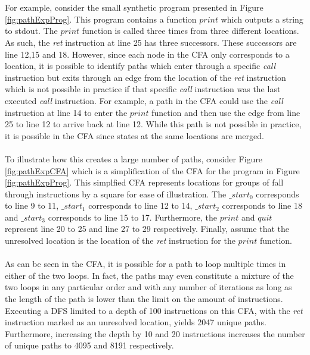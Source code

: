 \documentclass{kththesis}
\renewcommand{\it}[1]{\textit{#1}}
\begin{document}
\\ \\
For example, consider the small synthetic program presented in Figure \ref{fig:pathExpProg}. This program contains a function $print$ which outputs a string to stdout. The $print$ function is called three times from three different locations. As such, the \it{ret} instruction at line 25 has three successors. These successors are line 12,15 and 18. However, since each node in the CFA only corresponds to a location, it is possible to identify paths which enter through a specific \it{call} instruction but exits through an edge from the location of the \it{ret} instruction which is not possible in practice if that specific \it{call} instruction was the last executed \it{call} instruction. For example, a path in the CFA could use the \it{call} instruction at line 14 to enter the $print$ function and then use the edge from line 25 to line 12 to arrive back at line 12. While this path is not possible in practice, it is possible in the CFA since states at the same locations are merged.
\\ \\
To illustrate how this creates a large number of paths, consider Figure \ref{fig:pathExpCFA} which is a simplification of the CFA for the program in Figure \ref{fig:pathExpProg}. This simplfied CFA represents locations for groups of fall through instructions by a square for ease of illustration. The $\_start_0$ corresponds to line 9 to 11, $\_start_1$ corresponds to line 12 to 14, $\_start_2$ corresponds to line 18 and $\_start_3$ corresponds to line 15 to 17. Furthermore, the $print$ and $quit$ represent line 20 to 25 and line 27 to 29 respectively. Finally, assume that the unresolved location is the location of the \it{ret} instruction for the $print$ function. 
\\ \\
As can be seen in the CFA, it is possible for a path to loop multiple times in either of the two loops. In fact, the paths may even constitute a mixture of the two loops in any particular order and with any number of iterations as long as the length of the path is lower than the limit on the amount of instructions. Executing a DFS limited to a depth of 100 instructions on this CFA, with the \it{ret} instruction marked as an unresolved location, yields 2047 unique paths. Furthermore, increasing the depth by 10 and 20 instructions increases the number of unique paths to 4095 and 8191 respectively. 
\\ \\
\end{document}
